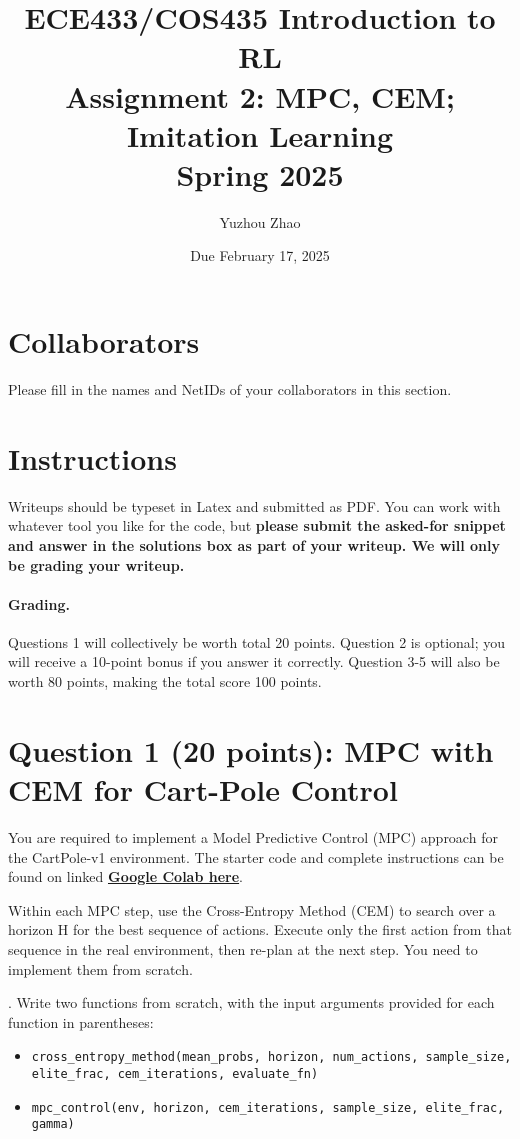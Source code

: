\documentclass{article}
\date{Due February 17, 2025}
\author{\begin{fillme}[width=0.3\textwidth]
Yuzhou Zhao
\end{fillme}} %
\title{ECE433/COS435 Introduction to RL\\
  Assignment 2: MPC, CEM; Imitation Learning\\
  Spring 2025\\
}
\begin{document}
    \maketitle
    \section*{Collaborators}
    \begin{fillme}
     Please fill in the names and NetIDs of your collaborators in this section.
    \end{fillme}

    \section*{Instructions}
    Writeups should be typeset in Latex and submitted as PDF. You can work with whatever tool you like for the code, but \textbf{please submit the asked-for snippet and answer in the solutions box as part of your writeup. We will only be grading your writeup.}
    
    \paragraph{Grading.} 
    Questions 1 will collectively be worth total 20 points. Question 2 is optional; you will receive a 10-point bonus if you answer it correctly. Question 3-5 will also be worth 80 points, making the total score 100 points.

    \clearpage

\section*{Question 1 (20 points): MPC with CEM for Cart-Pole Control}
You are required to implement a Model Predictive Control (MPC) approach for the CartPole-v1 environment. The starter code and complete instructions can be found on linked \href{https://colab.research.google.com/drive/1imnNUnqt-unv2MzHpaQBUlP5kFMWdnfI?usp=sharing}{\textbf{Google Colab here}}. 

Within each MPC step, use the Cross-Entropy Method (CEM) to search over a horizon H for the best sequence of actions. Execute only the first action from that sequence in the real environment, then re-plan at the next step. You need to implement them from scratch.

. Write two functions from scratch, with the input arguments provided for each function in parentheses:
\begin{itemize}
    \item \texttt{cross\_entropy\_method(mean\_probs, horizon, num\_actions, sample\_size, elite\_frac, cem\_iterations, evaluate\_fn)}
    \item \texttt{mpc\_control(env, horizon, cem\_iterations, sample\_size, elite\_frac, gamma)}
\end{itemize}
\end{document}
